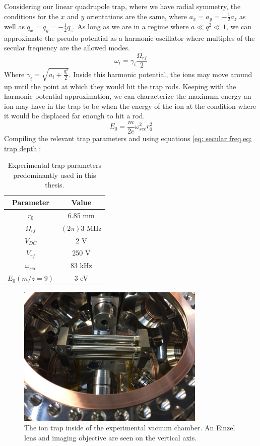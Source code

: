 Considering our linear quadrupole trap, where we have radial symmetry, the conditions for the $x$ and $y$ orientations are the same, where $a_x = a_y = -\frac{1}{2}a_z$ as well as $q_x = q_y = -\frac{1}{2}q_z$. As long as we are in a regime where $a \ll q^2 \ll 1$, we can approximate the pseudo-potential as a harmonic oscillator where multiples of the secular frequency are the allowed modes.
\begin{equation}
	\omega_i = \gamma_i \frac{\Omega_{rf}}{2}
	\label{eq: secular freq}
\end{equation}
Where $\gamma_i = \sqrt{a_i + \frac{q_i^2}{2}}$. Inside this harmonic potential, the ions may move around up until the point at which they would hit the trap rods. Keeping with the harmonic potential approximation, we can characterize the maximum energy an ion may have in the trap to be when the energy of the ion at the condition where it would be displaced far enough to hit a rod.
\begin{equation}
	E_0 = \frac{m}{2e} \omega_{sec}^2r_0^2
	\label{eq: trap depth}
\end{equation}
Compiling the relevant trap parameters and using equations \cref{eq: secular freq,eq: trap depth}:

\begin{table}[H]
	\centering
	\begin{tabular}{|c|c|}
		\hline
		Parameter & Value \\
		\hline
		$r_0$ & 6.85 mm \\
		$\Omega_{rf}$ & $(2 \pi) 3$ MHz \\
		$V_{DC}$ & 2 V \\
		$V_{rf}$ & 250 V \\
		$\omega_{sec}$ & 83 kHz \\
		$E_0(m/z=9)$ & 3 eV \\
		\hline
	\end{tabular}
	\caption{Experimental trap parameters predominantly used in this thesis.}
	\label{tab: trap params}
\end{table}

\begin{figure}[H]
	\centering
	\includegraphics[width=0.8\textwidth]{images/ion_trap.jpg}
	\caption{The ion trap inside of the experimental vacuum chamber. An Einzel lens and imaging objective are seen on the vertical axis.}
\end{figure}

